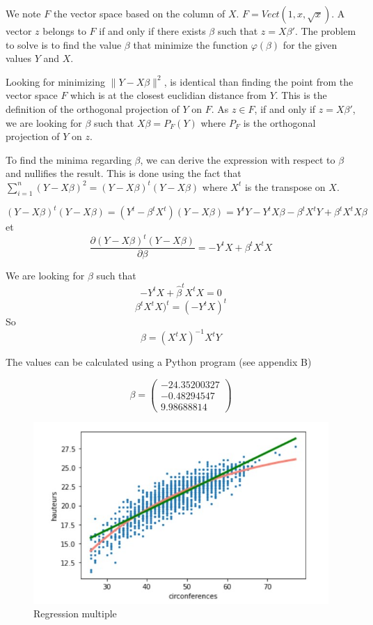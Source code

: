 \documentclass[
	12pt, %
]{article}
\theoremstyle{definition}
\begin{document}
We note $F$ the vector space based on the column of $X$. $F = Vect(1,x,\sqrt{x})$. A vector $z$ belongs to $F$ if and only if there exists $\beta$ such that $z = X\beta'$. The problem to solve is to find the value $\beta$ that minimize the function $\varphi(\beta)$ for the given values $Y$ and $X$. 

\bigskip
Looking for minimizing $\lVert Y - X\beta \rVert^2$, is identical than finding the point from the vector space $F$ which is at the closest euclidian distance from $Y$. This is the definition of the orthogonal projection of $Y$ on $F$. As $z \in F$, if and only if $z = X\beta'$, we are looking for $\beta$ such that $X\beta = P_F(Y)$ where $P_F$ is the orthogonal projection of $Y$ on $z$.  

\bigskip
To find the minima regarding $\beta$, we can derive the expression with respect to $\beta$ and nullifies the result. This is done using the fact that $\sum_{i=1}^{n}{(Y-X\beta)^2} = (Y-X\beta)^t(Y-X\beta)$ where $X^t$ is the transpose on $X$.

$$
(Y-X\beta)^t(Y-X\beta) = (Y^t-\beta^tX^t)(Y-X\beta) = Y^tY-Y^tX\beta - \beta^tX^tY + \beta^tX^tX\beta
$$
et
$$
\frac{\partial (Y-X\beta)^t(Y-X\beta) }{\partial \beta} = -Y^tX + \beta^tX^tX
$$

We are looking for $\beta$ such that
$$
-Y^tX + \hat{\beta}^tX^tX = 0
$$
$$
\beta^tX^tX)^t = (-Y^tX)^t
$$
So
$$
\beta = (X^tX)^{-1}X^tY
$$

The values can be calculated using a Python program (see appendix B)

$$\beta = \begin{pmatrix} -24.35200327 \\  -0.48294547 \\ 9.98688814 \end{pmatrix}$$

\begin{figure}[H]
	\includegraphics[scale=1]{regression_multiple.jpg}
    \caption{Regression multiple}
    \label{fig:Regression multiple}
\end{figure}
\end{document}
